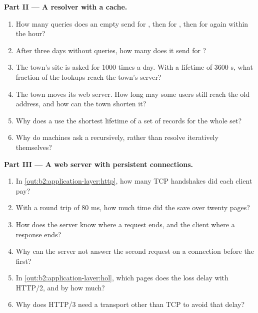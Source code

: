 \begin{problem}
\medskip\noindent\textbf{Part II --- A resolver with a cache.}\par\nopagebreak
\begin{enumerate}[resume, beginpenalty=10000]
\item How many queries does an empty  send for , then for , then for  again
within the hour?
\item After three days without queries, how many does it send for ?
\item The town's site is asked for 1000 times a day. With a lifetime of 3600 s, what fraction of the lookups reach
the town's server?
\item The town moves its web server. How long may some users still reach the old address, and how can the town
shorten it?
\item Why does a  use the shortest lifetime of a set of records for the whole set?
\item Why do machines ask a  recursively, rather than resolve iteratively themselves?
\end{enumerate}

\medskip\noindent\textbf{Part III --- A web server with persistent connections.}\par\nopagebreak
\begin{enumerate}[resume, beginpenalty=10000]
\item In \cref{out:b2:application-layer:http}, how many TCP handshakes did each client pay?
\item With a round trip of 80 ms, how much time did the  save over twenty pages?
\item How does the server know where a request ends, and the client where a response ends?
\item Why can the server not answer the second request on a connection before the first?
\item In \cref{out:b2:application-layer:hol}, which pages does the loss delay with HTTP/2, and by how much?
\item Why does HTTP/3 need a transport other than TCP to avoid that delay?
\end{enumerate}


\end{problem}
